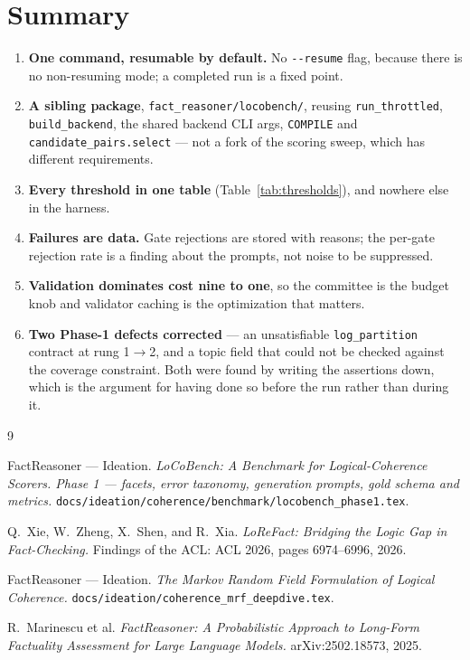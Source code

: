 \documentclass[11pt]{article}
\newcommand{\readout}[1]{\texttt{#1}}
\newcommand{\pymod}[1]{\texttt{#1}}
\begin{document}
\section{Summary}
\label{sec:summary}

\begin{enumerate}[leftmargin=*,nosep,label=\arabic*.]
  \item \textbf{One command, resumable by default.} No \texttt{-{}-resume} flag, because there is
        no non-resuming mode; a completed run is a fixed point.
  \item \textbf{A sibling package}, \pymod{fact\_reasoner/locobench/}, reusing
        \texttt{run\_throttled}, \texttt{build\_backend}, the shared backend CLI args,
        \texttt{COMPILE} and \texttt{candidate\_pairs.select} --- not a fork of the scoring sweep,
        which has different requirements.
  \item \textbf{Every threshold in one table} (Table~\ref{tab:thresholds}), and nowhere else in
        the harness.
  \item \textbf{Failures are data.} Gate rejections are stored with reasons; the per-gate
        rejection rate is a finding about the prompts, not noise to be suppressed.
  \item \textbf{Validation dominates cost nine to one}, so the committee is the budget knob and
        validator caching is the optimization that matters.
  \item \textbf{Two Phase-1 defects corrected} --- an unsatisfiable \readout{log\_partition}
        contract at rung 1$\to$2, and a topic field that could not be checked against the coverage
        constraint. Both were found by writing the assertions down, which is the argument for
        having done so before the run rather than during it.
\end{enumerate}

\begin{thebibliography}{9}\small

 FactReasoner --- Ideation.
  \emph{LoCoBench: A Benchmark for Logical-Coherence Scorers. Phase 1 --- facets, error taxonomy,
  generation prompts, gold schema and metrics.}
  \texttt{docs/ideation/coherence/benchmark/locobench\_phase1.tex}.

 Q.~Xie, W.~Zheng, X.~Shen, and R.~Xia.
  \emph{LoReFact: Bridging the Logic Gap in Fact-Checking.}
  Findings of the ACL: ACL 2026, pages 6974--6996, 2026.

 FactReasoner --- Ideation.
  \emph{The Markov Random Field Formulation of Logical Coherence.}
  \texttt{docs/ideation/coherence\_mrf\_deepdive.tex}.

 R.~Marinescu et al.
  \emph{FactReasoner: A Probabilistic Approach to Long-Form Factuality Assessment for Large
  Language Models.} arXiv:2502.18573, 2025.

\end{thebibliography}
\end{document}
